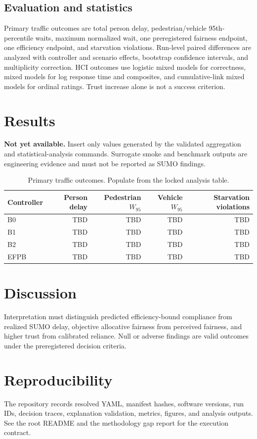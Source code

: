 \documentclass[11pt,a4paper]{article}
\begin{document}
\subsection{Evaluation and statistics}
Primary traffic outcomes are total person delay, pedestrian/vehicle 95th-percentile waits, maximum normalized wait, one preregistered fairness endpoint, one efficiency endpoint, and starvation violations. Run-level paired differences are analyzed with controller and scenario effects, bootstrap confidence intervals, and multiplicity correction. HCI outcomes use logistic mixed models for correctness, mixed models for log response time and composites, and cumulative-link mixed models for ordinal ratings. Trust increase alone is not a success criterion.

\section{Results}
\textbf{Not yet available.} Insert only values generated by the validated aggregation and statistical-analysis commands. Surrogate smoke and benchmark outputs are engineering evidence and must not be reported as SUMO findings.

\begin{table}[h]
\centering
\caption{Primary traffic outcomes. Populate from the locked analysis table.}
\begin{tabular}{lrrrr}
\toprule
Controller & Person delay & Pedestrian $W_{95}$ & Vehicle $W_{95}$ & Starvation violations\\
\midrule
B0 & TBD & TBD & TBD & TBD\\
B1 & TBD & TBD & TBD & TBD\\
B2 & TBD & TBD & TBD & TBD\\
EFPB & TBD & TBD & TBD & TBD\\
\bottomrule
\end{tabular}
\end{table}

\section{Discussion}
Interpretation must distinguish predicted efficiency-bound compliance from realized SUMO delay, objective allocative fairness from perceived fairness, and higher trust from calibrated reliance. Null or adverse findings are valid outcomes under the preregistered decision criteria.

\section{Reproducibility}
The repository records resolved YAML, manifest hashes, software versions, run IDs, decision traces, explanation validation, metrics, figures, and analysis outputs. See the root README and the methodology gap report for the execution contract.
\end{document}
